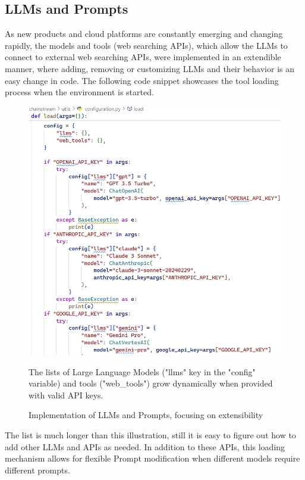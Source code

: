 \subsection{LLMs and Prompts}
As new products and cloud platforms are constantly emerging and changing rapidly, the models and tools (web searching APIs), which allow the LLMs to connect to external web searching APIs, were implemented in an extendible manner, where adding, removing or customizing LLMs and their behavior is an easy change in code. The following code snippet showcases the tool loading process when the environment is started.
\begin{figure}[htbp]
    \centering
    \includegraphics[width=.9\linewidth]{./figures/llms-implementation.png}
    \caption{Implementation of LLMs and Prompts, focusing on extensibility}
    \begin{flushleft}
        \small The lists of Large Language Models ("llms" key in the "config" variable) and tools ("web\_tools") grow dynamically when provided with valid API keys.
    \end{flushleft}
\end{figure}\newline
The list is much longer than this illustration, still it is easy to figure out how to add other LLMs and APIs as needed.\newline
In addition to these APIs, this loading mechanism allows for flexible Prompt modification when different models require different prompts.\newpage
